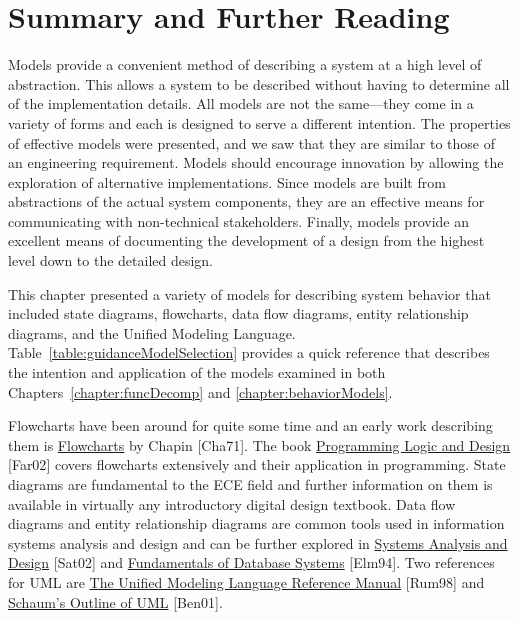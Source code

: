 \section{Summary and Further Reading}
\label{section:summary-and-further-reading}

Models provide a convenient method of describing a system at a high
level of abstraction. This allows a system to be described without
having to determine all of the implementation details. All models are
not the same---they come in a variety of forms and each is designed to
serve a different intention. The properties of effective models were
presented, and we saw that they are similar to those of an engineering
requirement. Models should encourage innovation by allowing the
exploration of alternative implementations. Since models are built from
abstractions of the actual system components, they are an effective
means for communicating with non-technical stakeholders. Finally, models
provide an excellent means of documenting the development of a design
from the highest level down to the detailed design.

This chapter presented a variety of models for describing system
behavior that included state diagrams, flowcharts, data flow diagrams,
entity relationship diagrams, and the Unified Modeling Language. 
Table~\ref{table:guidanceModelSelection}
provides a quick reference that describes the intention and
application of the models examined in both 
Chapters~\ref{chapter:funcDecomp} and \ref{chapter:behaviorModels}.

Flowcharts have been around for quite some time and an early work
describing them is \ul{Flowcharts} by Chapin {[}Cha71{]}. The book
\ul{Programming Logic and Design} {[}Far02{]} covers flowcharts
extensively and their application in programming. State diagrams are
fundamental to the ECE field and further information on them is
available in virtually any introductory digital design textbook. Data
flow diagrams and entity relationship diagrams are common tools used in
information systems analysis and design and can be further explored in
\ul{Systems Analysis and Design} {[}Sat02{]} and \ul{Fundamentals of
Database Systems} {[}Elm94{]}. Two references for UML are \ul{The
Unified Modeling Language Reference Manual} {[}Rum98{]} and \\
\ul{Schaum's Outline of UML} {[}Ben01{]}.
